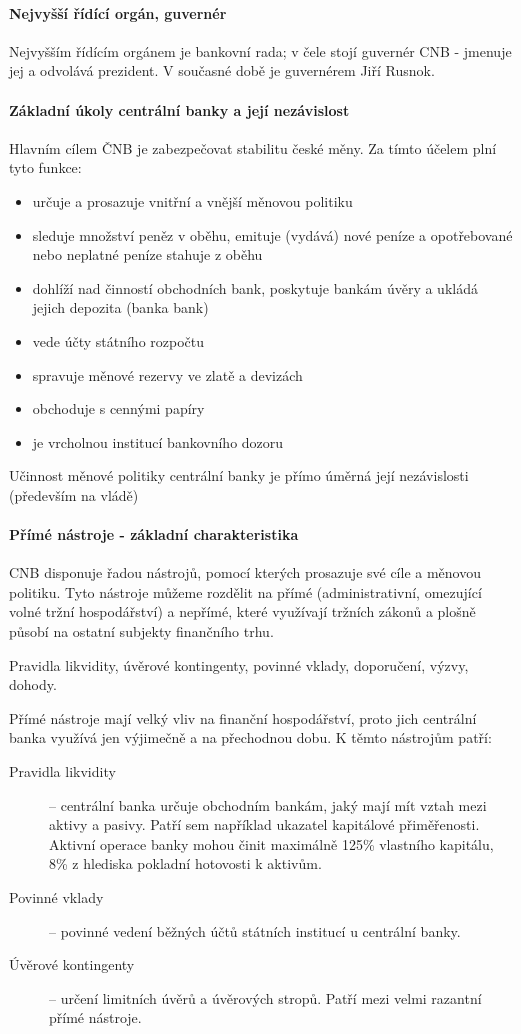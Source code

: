 \paragraph{Nejvyšší řídící orgán, guvernér}
Nejvyšším řídícím orgánem je bankovní rada; v čele stojí guvernér CNB - jmenuje jej a odvolává prezident. V současné době je guvernérem Jiří Rusnok.

\paragraph{Základní úkoly centrální banky a její nezávislost}
Hlavním cílem ČNB je zabezpečovat stabilitu české měny. Za tímto účelem plní tyto funkce:
\begin{itemize}
    \item určuje a prosazuje vnitřní a vnější měnovou politiku
    \item sleduje množství peněz v oběhu, emituje (vydává) nové peníze a opotřebované nebo neplatné peníze stahuje z oběhu
    \item dohlíží nad činností obchodních bank, poskytuje bankám úvěry a ukládá jejich depozita (banka bank)
    \item vede účty státního rozpočtu
    \item spravuje měnové rezervy ve zlatě a devizách
    \item obchoduje s cennými papíry
    \item je vrcholnou institucí bankovního dozoru
\end{itemize}

Učinnost měnové politiky centrální banky je přímo úměrná její nezávislosti (především na vládě)

\paragraph{Přímé nástroje - základní charakteristika}
CNB disponuje řadou nástrojů, pomocí kterých prosazuje své cíle a měnovou politiku. Tyto nástroje můžeme rozdělit na přímé (administrativní, omezující volné tržní hospodářství) a nepřímé, které využívají tržních zákonů a plošně působí na ostatní subjekty finančního trhu.

Pravidla likvidity, úvěrové kontingenty, povinné vklady, doporučení, výzvy, dohody.

Přímé nástroje mají velký vliv na finanční hospodářství, proto jich centrální banka využívá jen výjimečně a na přechodnou dobu. K těmto nástrojům patří:
\begin{description}
    \item[Pravidla likvidity] -- centrální banka určuje obchodním bankám, jaký mají mít vztah mezi aktivy a pasivy. Patří sem například ukazatel kapitálové přiměřenosti. Aktivní operace banky mohou činit maximálně 125\% vlastního kapitálu, 8\% z hlediska pokladní hotovosti k aktivům.
    \item[Povinné vklady] -- povinné vedení běžných účtů státních institucí u centrální banky.
    \item[Úvěrové kontingenty] -- určení limitních úvěrů a úvěrových stropů. Patří mezi velmi razantní přímé nástroje.
\end{description}

